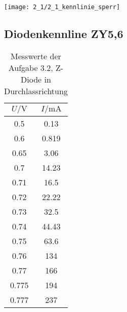 \documentclass[a4paper, 12pt]{article}
\begin{document}
\begin{center}
 \texttt{[image: 2\_1/2\_1\_kennlinie\_sperr]}
\end{center}

\pagebreak
\subsection{Diodenkennline ZY5,6}

\begin{multicols}{2}
\begin{center}
  \begin{table}[H]
\begin{center}
\begin{tabular}{@{}c|c@{}}
\toprule
$U / \si{\volt}$     & $I / \si{\milli\ampere}$     \\ \midrule
0.5   & 0.13  \\
0.6   & 0.819 \\
0.65  & 3.06  \\
0.7   & 14.23 \\
0.71  & 16.5  \\
0.72  & 22.22 \\
0.73  & 32.5  \\
0.74  & 44.43 \\
0.75  & 63.6  \\
0.76  & 134   \\
0.77  & 166   \\
0.775 & 194   \\
0.777 & 237   \\ \bottomrule
\end{tabular}
\end{center}
\caption{Messwerte der Aufgabe 3.2, Z-Diode in Durchlassrichtung}
\end{table}
\columnbreak


\end{center}
\end{multicols}
\end{document}
